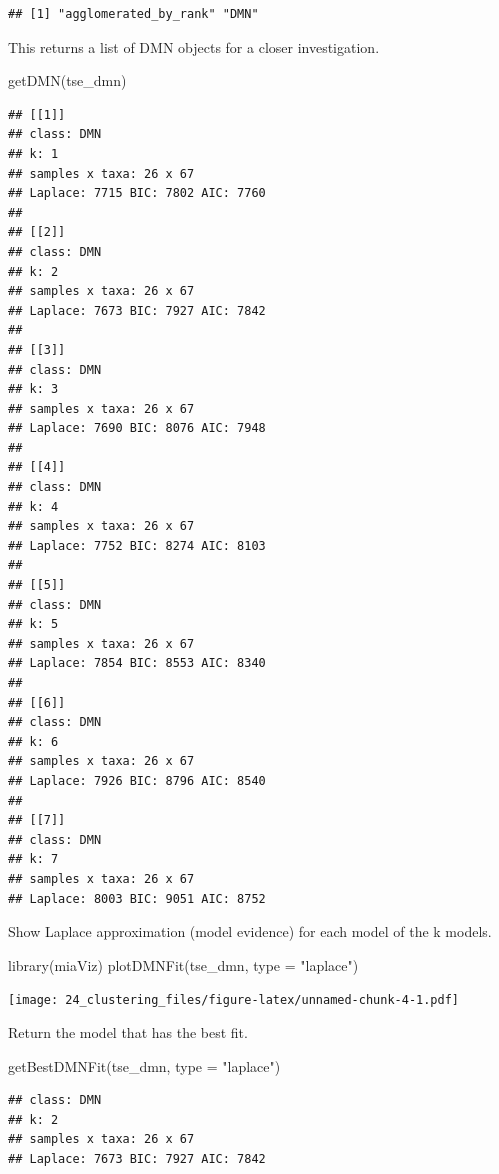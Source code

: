 \documentclass[
]{book}
\newenvironment{Shaded}{\begin{snugshade}}{\end{snugshade}}
\newcommand{\AttributeTok}[1]{\textcolor[rgb]{0.77,0.63,0.00}{#1}}
\newcommand{\FunctionTok}[1]{\textcolor[rgb]{0.00,0.00,0.00}{#1}}
\newcommand{\NormalTok}[1]{#1}
\newcommand{\StringTok}[1]{\textcolor[rgb]{0.31,0.60,0.02}{#1}}
\begin{document}
\begin{verbatim}
## [1] "agglomerated_by_rank" "DMN"
\end{verbatim}

This returns a list of DMN objects for a closer investigation.

\begin{Shaded}
\begin{Highlighting}[]
\FunctionTok{getDMN}\NormalTok{(tse\_dmn)}
\end{Highlighting}
\end{Shaded}

\begin{verbatim}
## [[1]]
## class: DMN 
## k: 1 
## samples x taxa: 26 x 67 
## Laplace: 7715 BIC: 7802 AIC: 7760 
## 
## [[2]]
## class: DMN 
## k: 2 
## samples x taxa: 26 x 67 
## Laplace: 7673 BIC: 7927 AIC: 7842 
## 
## [[3]]
## class: DMN 
## k: 3 
## samples x taxa: 26 x 67 
## Laplace: 7690 BIC: 8076 AIC: 7948 
## 
## [[4]]
## class: DMN 
## k: 4 
## samples x taxa: 26 x 67 
## Laplace: 7752 BIC: 8274 AIC: 8103 
## 
## [[5]]
## class: DMN 
## k: 5 
## samples x taxa: 26 x 67 
## Laplace: 7854 BIC: 8553 AIC: 8340 
## 
## [[6]]
## class: DMN 
## k: 6 
## samples x taxa: 26 x 67 
## Laplace: 7926 BIC: 8796 AIC: 8540 
## 
## [[7]]
## class: DMN 
## k: 7 
## samples x taxa: 26 x 67 
## Laplace: 8003 BIC: 9051 AIC: 8752
\end{verbatim}

Show Laplace approximation (model evidence) for each model of the k models.

\begin{Shaded}
\begin{Highlighting}[]
\FunctionTok{library}\NormalTok{(miaViz)}
\FunctionTok{plotDMNFit}\NormalTok{(tse\_dmn, }\AttributeTok{type =} \StringTok{"laplace"}\NormalTok{)}
\end{Highlighting}
\end{Shaded}

\texttt{[image: 24\_clustering\_files/figure-latex/unnamed-chunk-4-1.pdf]}

Return the model that has the best fit.

\begin{Shaded}
\begin{Highlighting}[]
\FunctionTok{getBestDMNFit}\NormalTok{(tse\_dmn, }\AttributeTok{type =} \StringTok{"laplace"}\NormalTok{)}
\end{Highlighting}
\end{Shaded}

\begin{verbatim}
## class: DMN 
## k: 2 
## samples x taxa: 26 x 67 
## Laplace: 7673 BIC: 7927 AIC: 7842
\end{verbatim}
\end{document}
